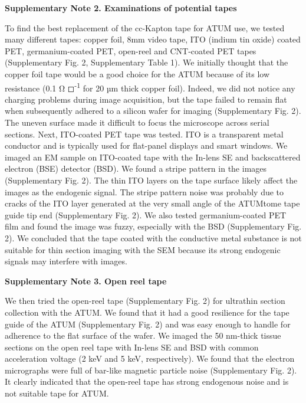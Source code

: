\documentclass{article}
\begin{document}
\textbf{Supplementary Note 2. Examinations of potential tapes}

To find the best replacement of the cc-Kapton tape for ATUM use, we tested many different tapes: copper foil, 8mm video tape, ITO (indium tin oxide) coated PET, germanium-coated PET, open-reel and CNT-coated PET tapes (Supplementary Fig. 2, Supplementary Table 1). We initially thought that the copper foil tape would be a good choice for the ATUM because of its low resistance (0.1 Ω ◻\textsuperscript{-1} for 20 µm thick copper foil). Indeed, we did not notice any charging problems during image acquisition, but the tape failed to remain flat when subsequently adhered to a silicon wafer for imaging (Supplementary Fig. 2). The uneven surface made it difficult to focus the microscope across serial sections. Next, ITO-coated PET tape was tested. ITO is a transparent metal conductor and is typically used for flat-panel displays and smart windows. We imaged an EM sample on ITO-coated tape with the In-lens SE and backscattered electron (BSE) detector (BSD). We found a stripe pattern in the images (Supplementary Fig. 2). The thin ITO layers on the tape surface likely affect the images as the endogenic signal. The stripe pattern noise was probably due to cracks of the ITO layer generated at the very small angle of the ATUMtome tape guide tip end (Supplementary Fig. 2). We also tested germanium-coated PET film and found the image was fuzzy, especially with the BSD (Supplementary Fig. 2). We concluded that the tape coated with the conductive metal substance is not suitable for thin section imaging with the SEM because its strong endogenic signals may interfere with images.

\textbf{Supplementary Note 3.  Open reel tape}

We then tried the open-reel tape (Supplementary Fig. 2) for ultrathin section collection with the ATUM. We found that it had a good resilience for the tape guide of the ATUM (Supplementary Fig. 2) and was easy enough to handle for adherence to the flat surface of the wafer. We imaged the 50 nm-thick tissue sections on the open reel tape with In-lens SE and BSD with common acceleration voltage (2 keV and 5 keV, respectively). We found that the electron micrographs were full of bar-like magnetic particle noise (Supplementary Fig. 2). It clearly indicated that the open-reel tape has strong endogenous noise and is not suitable tape for ATUM.
\end{document}
